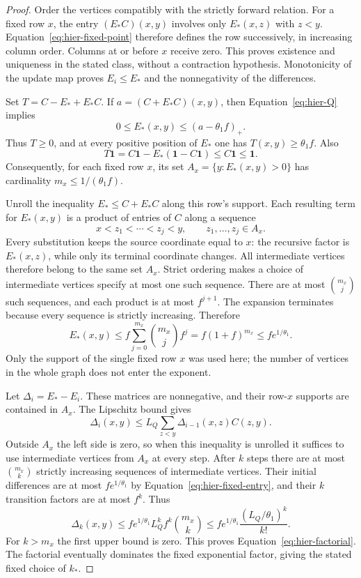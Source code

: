 \begin{proof}
Order the vertices compatibly with the strictly forward relation.  For a
fixed row $x$, the entry $(E_*C)(x,y)$ involves only $E_*(x,z)$ with
$z<y$.  Equation~\eqref{eq:hier-fixed-point} therefore defines the row
successively, in increasing column order.  Columns at or before $x$
receive zero.  This proves existence and uniqueness in the stated class,
without a contraction hypothesis.  Monotonicity of the update map proves
$E_i\leq E_*$ and the nonnegativity of the differences.

Set $T=C-E_*+E_*C$.  If $a=(C+E_*C)(x,y)$, then
Equation~\eqref{eq:hier-Q} implies
\[
 0\leq E_*(x,y)\leq(a-\theta_1f)_+.
\]
Thus $T\geq0$, and at every positive position of $E_*$ one has
$T(x,y)\geq\theta_1f$.  Also
\begin{equation}
 T\mathbf 1=C\mathbf 1-E_*(\mathbf 1-C\mathbf 1)
       \leq C\mathbf 1\leq\mathbf 1.
 \label{eq:hier-fixed-residual-mass}
\end{equation}
Consequently, for each fixed row $x$, its set
$A_x=\{y:E_*(x,y)>0\}$ has cardinality
$m_x\leq1/(\theta_1f)$.

Unroll the inequality $E_*\leq C+E_*C$ along this row's support.
Each resulting term for $E_*(x,y)$ is a product of entries of $C$
along a sequence
\[
 x<z_1<\cdots<z_j<y,
 \qquad z_1,\ldots,z_j\in A_x.
\]
Every substitution keeps the source coordinate equal to $x$: the
recursive factor is $E_*(x,z)$, while only its terminal coordinate
changes.  All intermediate vertices therefore belong to the same set
$A_x$.  Strict ordering makes a choice of intermediate vertices specify
at most one such sequence.
There are at most $\binom{m_x}{j}$ such sequences, and each product
is at most $f^{j+1}$.  The expansion terminates because every sequence
is strictly increasing.  Therefore
\begin{equation}
 E_*(x,y)\leq
 f\sum_{j=0}^{m_x}\binom{m_x}{j}f^j
 =f(1+f)^{m_x}\leq fe^{1/\theta_1}.
 \label{eq:hier-fixed-entry}
\end{equation}
Only the support of the single fixed row $x$ was used here; the number
of vertices in the whole graph does not enter the exponent.

Let $\Delta_i=E_*-E_i$.  These matrices are nonnegative, and their
row-$x$ supports are contained in $A_x$.  The Lipschitz bound gives
\[
 \Delta_i(x,y)\leq
 L_Q\sum_{z<y}\Delta_{i-1}(x,z)C(z,y).
\]
Outside $A_x$ the left side is zero, so when this inequality is unrolled
it suffices to use intermediate vertices from $A_x$ at every step.
After $k$ steps there are at most $\binom{m_x}{k}$ strictly increasing
sequences of intermediate vertices.  Their initial differences are at
most $fe^{1/\theta_1}$ by Equation~\eqref{eq:hier-fixed-entry}, and
their $k$ transition factors are at most $f^k$.  Thus
\[
 \Delta_k(x,y)
 \leq fe^{1/\theta_1}L_Q^kf^k\binom{m_x}{k}
 \leq fe^{1/\theta_1}\frac{(L_Q/\theta_1)^k}{k!}.
\]
For $k>m_x$ the first upper bound is zero.  This proves
Equation~\eqref{eq:hier-factorial}.  The factorial eventually dominates
the fixed exponential factor, giving the stated fixed choice of $k_*$.
\end{proof}

